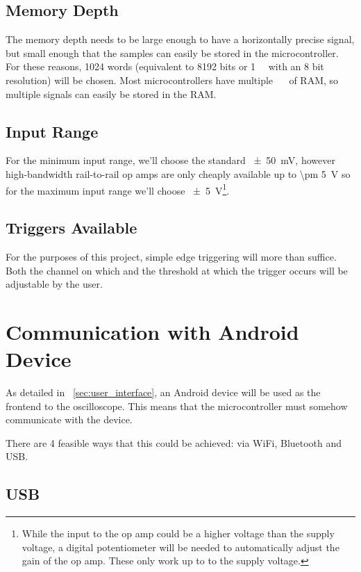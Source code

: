 \subsection*{Memory Depth}

The memory depth needs to be large enough to have a horizontally precise signal,
but small enough that the samples can easily be stored in the microcontroller.
For these reasons, 1024 words (equivalent to 8192 bits or \SI{1}{\kilo\byte}
with an 8 bit resolution) will be chosen. Most microcontrollers have multiple
\SI{}{\kilo\byte} of RAM, so multiple signals can easily be stored in the
RAM.

\subsection*{Input Range}

For the minimum input range, we'll choose the standard \SI{\pm 50}{\mV}, however
high-bandwidth rail-to-rail op amps are only cheaply available up to \SI{\pm
5}{\V} so for the maximum input range we'll choose \SI{\pm 5}{\V}\footnote{While
  the input to the op amp could be a higher voltage than the supply voltage, a
digital potentiometer will be needed to automatically adjust the gain of the op
amp. These only work up to to the supply voltage.}.

\subsection*{Triggers Available}

For the purposes of this project, simple edge triggering will more than suffice.
Both the channel on which and the threshold at which the trigger occurs will be
adjustable by the user.

\section{Communication with Android Device}
\label{sec:CommOptions}

As detailed in ~\cref{sec:user_interface}, an Android device will be used as the
frontend to the oscilloscope. This means that the microcontroller must somehow
communicate with the device.

There are 4 feasible ways that this could be achieved: via WiFi, Bluetooth and
USB.

\subsection*{USB}

